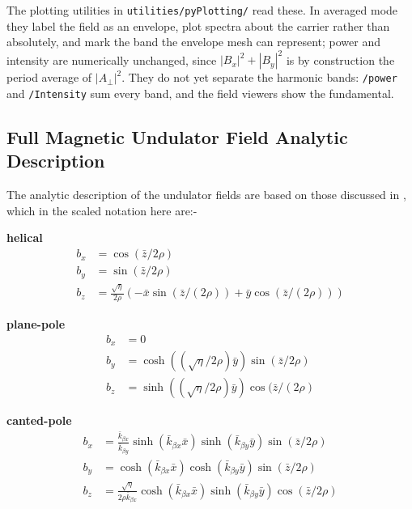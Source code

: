 \documentclass[12pt]{article}%
\begin{document}
The plotting utilities in {\tt utilities/pyPlotting/} read these. In averaged mode they label the field as an envelope, plot spectra about the carrier rather than absolutely, and mark the band the envelope mesh can represent; power and intensity are numerically unchanged, since $|B_x|^2 + |B_y|^2$ is by construction the period average of $|A_\bot|^2$. They do not yet separate the harmonic bands: {\tt /power} and {\tt /Intensity} sum every band, and the field viewers show the fundamental.

\subsection{Full Magnetic Undulator Field Analytic Description}

\label{puff-undfields}

The analytic description of the undulator fields are based on those discussed in \cite{scharlemann1}, which in the scaled notation here are:-

{\bf helical}
\begin{align}
b_x  & = \cos({\bar{z}/2\rho}) \\
b_y & =  \sin({\bar{z}/2\rho}) \\
b_z & = \frac{\sqrt{\eta}}{2\rho} (-\bar{x}\sin({\bar{z} / (2 \rho)}) + \bar{y}\cos({\bar{z} / (2 \rho)}))
\end{align}


{\bf plane-pole}
\begin{align}
b_x  & = 0 \\
b_y & =  \cosh((\sqrt{\eta}/{2\rho}) \bar{y}) \sin({\bar{z}/2\rho}) \\
b_z & =   \sinh((\sqrt{\eta}/{2\rho}) \bar{y}) \cos({\bar{z} / (2 \rho)}
\end{align}




{\bf canted-pole}
\begin{align}
b_x  & =  \frac{\bar{k}_{\beta x}}{\bar{k}_{\beta y}}  \sinh(\bar{k}_{\beta x} \bar{x} )  \sinh(   \bar{k}_{\beta y} \bar{y}    )   \sin({\bar{z}/2\rho}) \label{cp1} \\
b_y & =   \cosh(\bar{k}_{\beta x} \bar{x} )  \cosh(   \bar{k}_{\beta y} \bar{y}    )   \sin({\bar{z}/2\rho}) \label{cp2}\\
b_z & = \frac{\sqrt{\eta}}{2\rho \bar{k}_{\beta x}}     \cosh(\bar{k}_{\beta x} \bar{x} )    \sinh(   \bar{k}_{\beta y} \bar{y}    )    \cos({\bar{z}/2\rho}) \label{cp3}
\end{align}
\end{document}

